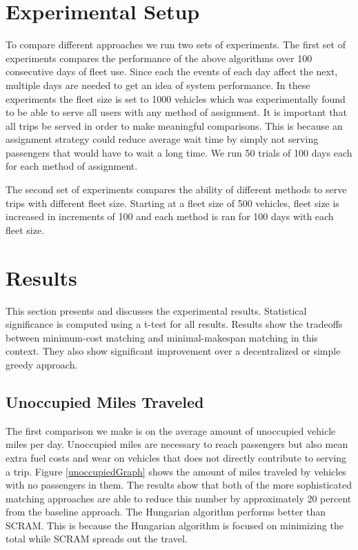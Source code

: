 \documentclass[letterpaper]{article}
\begin{document}
\section{Experimental Setup}
To compare different approaches we run two sets of experiments. The first set of experiments compares the performance of the above algorithms over 100 consecutive days of fleet use. Since each the events of each day affect the next, multiple days are needed to get an idea of system performance. In these experiments the fleet size is set to 1000 vehicles which was experimentally found to be able to serve all users with any method of assignment. It is important that all trips be served in order to make meaningful comparisons. This is because an assignment strategy could reduce average wait time by simply not serving passengers that would have to wait a long time. We run 50 trials of 100 days each for each method of assignment.

The second set of experiments compares the ability of different methods to serve trips with different fleet size. Starting at a fleet size of 500 vehicles, fleet size is increased in increments of 100 and each method is ran for 100 days with each fleet size.

\section{Results}

This section presents and discusses the experimental results. Statistical significance is computed using a t-test for all results. Results show the tradeoffs between minimum-cost matching and minimal-makespan matching in this context. They also show significant improvement over a decentralized or simple greedy approach.

\subsection{Unoccupied Miles Traveled}

The first comparison we make is on the average amount of unoccupied vehicle miles per day. Unoccupied miles are necessary to reach passengers but also mean extra fuel costs and wear on vehicles that does not directly contribute to serving a trip. Figure \ref{unoccupiedGraph} shows the amount of miles traveled by vehicles with no passengers in them. The results show that both of the more sophisticated matching approaches are able to reduce this number by approximately 20 percent from the baseline approach. The Hungarian algorithm performs better than SCRAM. This is because the Hungarian algorithm is focused on minimizing the total while SCRAM spreads out the travel.  
\end{document}
